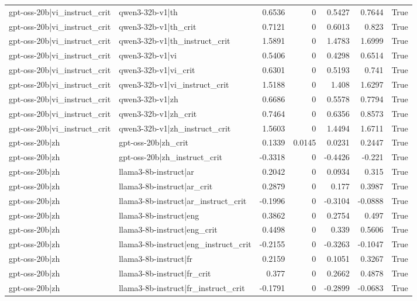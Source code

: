\begin{table}
\begin{tabular}{l l r r r r l}
gpt-oss-20b|vi_instruct_crit & qwen3-32b-v1|th & 0.6536 & 0 & 0.5427 & 0.7644 & True \\
gpt-oss-20b|vi_instruct_crit & qwen3-32b-v1|th_crit & 0.7121 & 0 & 0.6013 & 0.823 & True \\
gpt-oss-20b|vi_instruct_crit & qwen3-32b-v1|th_instruct_crit & 1.5891 & 0 & 1.4783 & 1.6999 & True \\
gpt-oss-20b|vi_instruct_crit & qwen3-32b-v1|vi & 0.5406 & 0 & 0.4298 & 0.6514 & True \\
gpt-oss-20b|vi_instruct_crit & qwen3-32b-v1|vi_crit & 0.6301 & 0 & 0.5193 & 0.741 & True \\
gpt-oss-20b|vi_instruct_crit & qwen3-32b-v1|vi_instruct_crit & 1.5188 & 0 & 1.408 & 1.6297 & True \\
gpt-oss-20b|vi_instruct_crit & qwen3-32b-v1|zh & 0.6686 & 0 & 0.5578 & 0.7794 & True \\
gpt-oss-20b|vi_instruct_crit & qwen3-32b-v1|zh_crit & 0.7464 & 0 & 0.6356 & 0.8573 & True \\
gpt-oss-20b|vi_instruct_crit & qwen3-32b-v1|zh_instruct_crit & 1.5603 & 0 & 1.4494 & 1.6711 & True \\
gpt-oss-20b|zh & gpt-oss-20b|zh_crit & 0.1339 & 0.0145 & 0.0231 & 0.2447 & True \\
gpt-oss-20b|zh & gpt-oss-20b|zh_instruct_crit & -0.3318 & 0 & -0.4426 & -0.221 & True \\
gpt-oss-20b|zh & llama3-8b-instruct|ar & 0.2042 & 0 & 0.0934 & 0.315 & True \\
gpt-oss-20b|zh & llama3-8b-instruct|ar_crit & 0.2879 & 0 & 0.177 & 0.3987 & True \\
gpt-oss-20b|zh & llama3-8b-instruct|ar_instruct_crit & -0.1996 & 0 & -0.3104 & -0.0888 & True \\
gpt-oss-20b|zh & llama3-8b-instruct|eng & 0.3862 & 0 & 0.2754 & 0.497 & True \\
gpt-oss-20b|zh & llama3-8b-instruct|eng_crit & 0.4498 & 0 & 0.339 & 0.5606 & True \\
gpt-oss-20b|zh & llama3-8b-instruct|eng_instruct_crit & -0.2155 & 0 & -0.3263 & -0.1047 & True \\
gpt-oss-20b|zh & llama3-8b-instruct|fr & 0.2159 & 0 & 0.1051 & 0.3267 & True \\
gpt-oss-20b|zh & llama3-8b-instruct|fr_crit & 0.377 & 0 & 0.2662 & 0.4878 & True \\
gpt-oss-20b|zh & llama3-8b-instruct|fr_instruct_crit & -0.1791 & 0 & -0.2899 & -0.0683 & True \\

\end{tabular}
\end{table}
